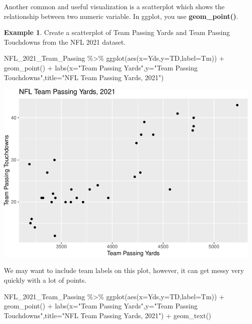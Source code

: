\documentclass[
]{book}
\newenvironment{Shaded}{\begin{snugshade}}{\end{snugshade}}
\newcommand{\AttributeTok}[1]{\textcolor[rgb]{0.77,0.63,0.00}{#1}}
\newcommand{\FunctionTok}[1]{\textcolor[rgb]{0.00,0.00,0.00}{#1}}
\newcommand{\NormalTok}[1]{#1}
\newcommand{\SpecialCharTok}[1]{\textcolor[rgb]{0.00,0.00,0.00}{#1}}
\newcommand{\StringTok}[1]{\textcolor[rgb]{0.31,0.60,0.02}{#1}}
\theoremstyle{definition}
\theoremstyle{definition}
\newtheorem{example}{Example}[chapter]
\theoremstyle{definition}
\theoremstyle{definition}
\theoremstyle{remark}
\begin{document}
Another common and useful visualization is a scatterplot which shows the relationship between two numeric variable. In ggplot, you use \textbf{geom\_point()}.

\begin{example}
Create a scatterplot of Team Passing Yards and Team Passing Touchdowns from the NFL 2021 dataset.

\begin{Shaded}
\begin{Highlighting}[]
\NormalTok{NFL\_2021\_Team\_Passing }\SpecialCharTok{\%\textgreater{}\%}
  \FunctionTok{ggplot}\NormalTok{(}\FunctionTok{aes}\NormalTok{(}\AttributeTok{x=}\NormalTok{Yds,}\AttributeTok{y=}\NormalTok{TD,}\AttributeTok{label=}\NormalTok{Tm)) }\SpecialCharTok{+} 
  \FunctionTok{geom\_point}\NormalTok{() }\SpecialCharTok{+}
  \FunctionTok{labs}\NormalTok{(}\AttributeTok{x=}\StringTok{"Team Passing Yards"}\NormalTok{,}\AttributeTok{y=}\StringTok{"Team Passing Touchdowns"}\NormalTok{,}\AttributeTok{title=}\StringTok{"NFL Team Passing Yards, 2021"}\NormalTok{)}
\end{Highlighting}
\end{Shaded}

\includegraphics{series_files/figure-latex/scatter1-1.pdf}

We may want to include team labels on this plot, however, it can get messy very quickly with a lot of points.

\begin{Shaded}
\begin{Highlighting}[]
\NormalTok{NFL\_2021\_Team\_Passing }\SpecialCharTok{\%\textgreater{}\%}
  \FunctionTok{ggplot}\NormalTok{(}\FunctionTok{aes}\NormalTok{(}\AttributeTok{x=}\NormalTok{Yds,}\AttributeTok{y=}\NormalTok{TD,}\AttributeTok{label=}\NormalTok{Tm)) }\SpecialCharTok{+} 
  \FunctionTok{geom\_point}\NormalTok{() }\SpecialCharTok{+}
  \FunctionTok{labs}\NormalTok{(}\AttributeTok{x=}\StringTok{"Team Passing Yards"}\NormalTok{,}\AttributeTok{y=}\StringTok{"Team Passing Touchdowns"}\NormalTok{,}\AttributeTok{title=}\StringTok{"NFL Team Passing Yards, 2021"}\NormalTok{) }\SpecialCharTok{+}
  \FunctionTok{geom\_text}\NormalTok{()}
\end{Highlighting}
\end{Shaded}


\end{example}
\end{document}
